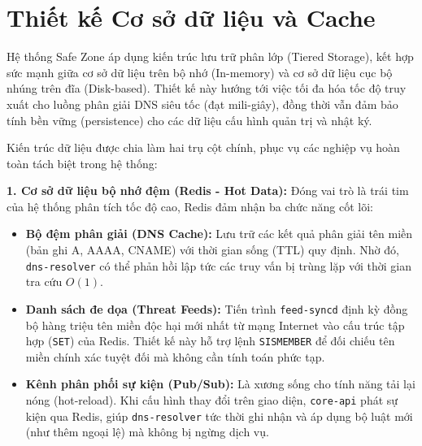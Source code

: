 \section{Thiết kế Cơ sở dữ liệu và Cache}

Hệ thống Safe Zone áp dụng kiến trúc lưu trữ phân lớp (Tiered Storage), kết hợp sức mạnh giữa cơ sở dữ liệu trên bộ nhớ (In-memory) và cơ sở dữ liệu cục bộ nhúng trên đĩa (Disk-based). Thiết kế này hướng tới việc tối đa hóa tốc độ truy xuất cho luồng phân giải DNS siêu tốc (đạt mili-giây), đồng thời vẫn đảm bảo tính bền vững (persistence) cho các dữ liệu cấu hình quản trị và nhật ký.



Kiến trúc dữ liệu được chia làm hai trụ cột chính, phục vụ các nghiệp vụ hoàn toàn tách biệt trong hệ thống:

\textbf{1. Cơ sở dữ liệu bộ nhớ đệm (Redis - Hot Data):}
Đóng vai trò là trái tim của hệ thống phân tích tốc độ cao, Redis đảm nhận ba chức năng cốt lõi:
\begin{itemize}
    \item \textbf{Bộ đệm phân giải (DNS Cache):} Lưu trữ các kết quả phân giải tên miền (bản ghi A, AAAA, CNAME) với thời gian sống (TTL) quy định. Nhờ đó, \texttt{dns-resolver} có thể phản hồi lập tức các truy vấn bị trùng lặp với thời gian tra cứu $O(1)$.
    \item \textbf{Danh sách đe dọa (Threat Feeds):} Tiến trình \texttt{feed-syncd} định kỳ đồng bộ hàng triệu tên miền độc hại mới nhất từ mạng Internet vào cấu trúc tập hợp (\texttt{SET}) của Redis. Thiết kế này hỗ trợ lệnh \texttt{SISMEMBER} để đối chiếu tên miền chính xác tuyệt đối mà không cần tính toán phức tạp.
    \item \textbf{Kênh phân phối sự kiện (Pub/Sub):} Là xương sống cho tính năng tải lại nóng (hot-reload). Khi cấu hình thay đổi trên giao diện, \texttt{core-api} phát sự kiện qua Redis, giúp \texttt{dns-resolver} tức thời ghi nhận và áp dụng bộ luật mới (như thêm ngoại lệ) mà không bị ngừng dịch vụ.
\end{itemize}

